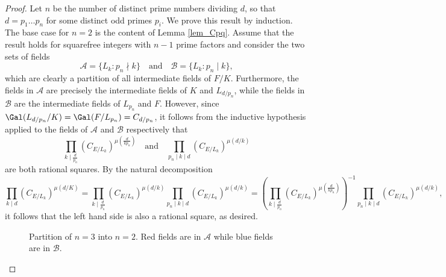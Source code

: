 \begin{proof}
    Let $n$ be the number of distinct prime numbers dividing $d$, so that $d=p_1\ldots p_n$ for some distinct odd primes $p_i$. We prove this result by induction. The base case for $n=2$ is the content of Lemma \ref*{lem_Cpq}. Assume that the result holds for squarefree integers with $n-1$ prime factors and consider the two sets of fields
    $$\mathcal{A}=\{L_k:p_n\nmid k\}\quad\text{and}\quad\mathcal{B}=\{L_k:p_n\mid k\},$$
    which are clearly a partition of all intermediate fields of $F/K$. Furthermore, the fields in $\mathcal{A}$ are precisely the intermediate fields of $K$ and $L_{d/p_n}$, while the fields in $\mathcal{B}$ are the intermediate fields of $L_{p_n}$ and $F$. However, since $\Gal(L_{d/p_n}/K)=\Gal(F/L_{p_n})=C_{d/p_n}$, it follows from the inductive hypothesis applied to the fields of $\mathcal{A}$ and $\mathcal{B}$ respectively that
    $$\prod_{k\mid \frac{d}{p_n}}(C_{E/L_k})^{\mu\left(\frac{d}{kp_n}\right)}\quad\text{and}\quad\prod_{p_n\mid k\mid d}(C_{E/L_{k}})^{\mu\left(d/k\right)}$$
    are both rational squares. By the natural decomposition
    $$\prod_{k\mid d}(C_{E/L_k})^{\mu(d/K)}=\prod_{k\mid \frac{d}{p_n}}(C_{E/L_k})^{\mu\left(d/k\right)}\prod_{p_n\mid k\mid d}(C_{E/L_{k}})^{\mu\left(d/k\right)}=\left(\prod_{k\mid \frac{d}{p_n}}(C_{E/L_k})^{\mu\left(\frac{d}{kp_n}\right)}\right)^{-1}\prod_{p_n\mid k\mid d}(C_{E/L_{k}})^{\mu\left(d/k\right)},$$
    it follows that the left hand side is also a rational square, as desired.
    \begin{figure}[!ht]
        \centering
        \caption[short]{Partition of $n=3$ into $n=2$. Red fields are in $\mathcal{A}$ while blue fields are in $\mathcal{B}$.}
    \end{figure}
\end{proof}


